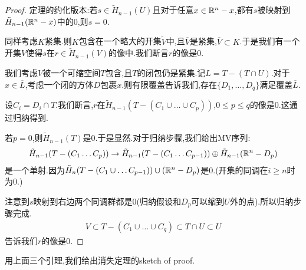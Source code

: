 \begin{proof}
    定理的约化版本:若$s \in \tilde{H}_{n-1}(U)$且对于任意$x \in \mathbb{R}^n-x$,都有$s$被映射到$\tilde{H}_{n-1}(\mathbb{R}^n-x)$中的$0$,则$s=0$.

    同样考虑$K$紧集.则$K$包含在一个略大的开集$\tilde{V}$中,且$\overline{V}$是紧集,$\overline{V} \subset K$.于是我们有一个开集$V$使得$s$在$r \in \tilde{H}_{n-1}(V)$的像中.我们断言$r$的像是$0$.

    我们考虑$V$被一个可缩空间$T$包含,且$T$的闭包仍是紧集.记$L=T-(T\cap U)$.对于$x \in \overline{L}$,考虑一个闭的方体$D$包裹$x$.则有限覆盖告诉我们,存在$\{D_1,\dots,D_q\}$满足覆盖$\overline{L}$.

    设$C_i=D_i \cap T$.我们断言,$r$在$\tilde{H}_{n-1}(T-(C_1\cup \dots \cup C_p))$,$0 \leq p \leq q$的像是$0$.这通过归纳得到.

    若$p=0$,则$\tilde{H}_{n-1}(T)$是$0$.于是显然.对于归纳步骤,我们给出MV序列:
    \begin{align*}
        \tilde{H}_{n-1}(T-(C_1\dots C_p)) \to \tilde{H}_{n-1}(T-(C_1\dots C_{p-1}))\oplus \tilde{H}_{n-1}(\mathbb{R}^n-D_p)
    \end{align*}
    是一个单射.因为$\tilde{H}_n(T-(C_1\cup \dots C_{p-1}))\cup (\mathbb{R}^n-D_p)$是$0$.(开集的同调在$i \geq n$时为$0$.)

    注意到$s$映射到右边两个同调群都是$0$(归纳假设和$D_p$可以缩到$U$外的点).所以归纳步骤完成.
    \begin{align*}
        V \subset T-(C_1\cup \dots \cup C_q)\subset T\cap U \subset U
    \end{align*}
    告诉我们$r$的像是$0$.
\end{proof}
用上面三个引理,我们给出消失定理的sketch of proof.
